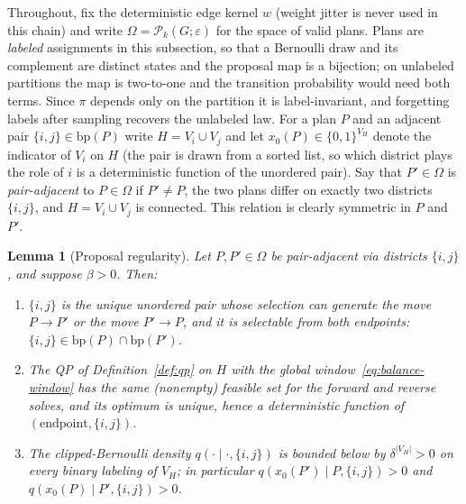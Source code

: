 \documentclass[11pt]{article}
\newtheorem{lemma}{Lemma}[section]
\begin{document}
Throughout, fix the deterministic edge kernel $w$ (weight jitter is
never used in this chain) and write $\Omega = \mathcal{P}_k(G;
\varepsilon)$ for the space of valid plans. Plans are \emph{labeled}
assignments in this subsection, so that a Bernoulli draw and its
complement are distinct states and the proposal map is a bijection;
on unlabeled partitions the map is two-to-one and the transition
probability would need both terms. Since $\pi$ depends only on the
partition it is label-invariant, and forgetting labels after
sampling recovers the unlabeled law. For a plan $P$ and an adjacent
pair $\{i,j\} \in \mathrm{bp}(P)$ write $H = V_i \cup V_j$ and let
$x_0(P) \in \{0,1\}^{V_H}$ denote the indicator of $V_i$ on $H$ (the
pair is drawn from a sorted list, so which district plays the role of
$i$ is a deterministic function of the unordered pair). Say that
$P' \in \Omega$ is \emph{pair-adjacent} to $P \in \Omega$ if
$P' \ne P$, the two plans differ on exactly two districts $\{i,j\}$,
and $H = V_i \cup V_j$ is connected. This relation is clearly
symmetric in $P$ and $P'$.

\begin{lemma}[Proposal regularity]\label{lem:qpmh-regular}
Let $P, P' \in \Omega$ be pair-adjacent via districts $\{i,j\}$, and
suppose $\beta > 0$. Then:
\begin{enumerate}
  \item[(i)] $\{i,j\}$ is the unique unordered pair whose selection
    can generate the move $P \to P'$ or the move $P' \to P$, and it
    is selectable from both endpoints:
    $\{i,j\} \in \mathrm{bp}(P) \cap \mathrm{bp}(P')$.
  \item[(ii)] The QP of Definition~\ref{def:qp} on $H$ with the
    global window~\eqref{eq:balance-window} has the same (nonempty)
    feasible set for the forward and reverse solves, and its optimum
    is unique, hence a deterministic function of
    $(\text{endpoint}, \{i,j\})$.
  \item[(iii)] The clipped-Bernoulli density
    $q(\cdot \mid \cdot, \{i,j\})$ is bounded below by
    $\delta^{|V_H|} > 0$ on every binary labeling of $V_H$; in
    particular $q(x_0(P') \mid P, \{i,j\}) > 0$ and
    $q(x_0(P) \mid P', \{i,j\}) > 0$.
\end{enumerate}
\end{lemma}
\end{document}
